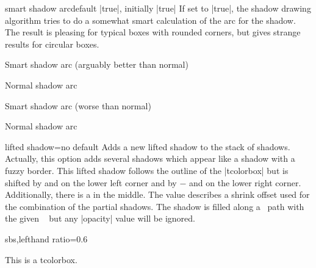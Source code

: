 \clearpage
\begin{docTcbKey}[][doc new=2015-05-05]{smart shadow arc}{}{default |true|,
  initially |true|}
If set to |true|, the shadow drawing algorithm tries to do a somewhat
smart calculation of the arc for the shadow. The result is pleasing for typical boxes
with rounded corners, but gives strange results for circular boxes.

\begin{dispExample}

\begin{tcolorbox}
Smart shadow arc (arguably better than normal)
\end{tcolorbox}
\hfill
\begin{tcolorbox}[smart shadow arc=false, drop shadow]
Normal shadow arc
\end{tcolorbox}
\hfill
\begin{tcolorbox}
Smart shadow arc (worse than normal)
\end{tcolorbox}
\hfill
\begin{tcolorbox}[circular arc, smart shadow arc=false, drop shadow]
Normal shadow arc
\end{tcolorbox}
\end{dispExample}
\end{docTcbKey}


\begin{docTcbKey}{lifted shadow}{=}{no default}
  Adds a new lifted shadow to the stack of shadows. Actually, this option
  adds several shadows which appear like a shadow with a fuzzy border.
  This lifted shadow follows the outline of the |tcolorbox| but is shifted by
   and  on the lower left corner and by
  $-$ and  on the lower right corner.
  Additionally, there is a  in the middle.
  The  value describes a shrink
  offset used for the combination of the partial shadows.
  The shadow is filled along a \tikzname\  path with the given \tikzname\   but
  any |opacity| value will be ignored.
\begin{dispExample*}{sbs,lefthand ratio=0.6}

\begin{tcolorbox}[title=My own shadow,
  lifted shadow={1mm}{-2mm}{3mm}{0.1mm}%
               {black!50!white}]
This is a tcolorbox.
\end{tcolorbox}
\end{dispExample*}
\end{docTcbKey}


